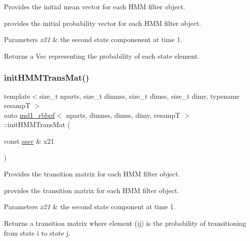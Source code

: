 Provides the initial mean vector for each H\+MM filter object. 

provides the initial probability vector for each H\+MM filter object. 
\begin{DoxyParams}{Parameters}
{\em x21} & the second state componenent at time 1. \\
\hline
\end{DoxyParams}
\begin{DoxyReturn}{Returns}
a Vec representing the probability of each state element. 
\end{DoxyReturn}
\mbox{\label{classmsl1__rbbpf_a811836dd2d71e3c46e688b9280aae108}} 
\subsubsection{\texorpdfstring{init\+H\+M\+M\+Trans\+Mat()}{initHMMTransMat()}}
{\footnotesize\ttfamily template$<$size\+\_\+t nparts, size\+\_\+t dimnss, size\+\_\+t dimss, size\+\_\+t dimy, typename resampT $>$ \\
auto \hyperlink{classmsl1__rbbpf}{msl1\+\_\+rbbpf}$<$ nparts, dimnss, dimss, dimy, resampT $>$\+::init\+H\+M\+M\+Trans\+Mat (\begin{DoxyParamCaption}\item[{const \hyperlink{classmsl1__rbbpf_a6703c548bb85bbe8e5a6baa723e8f0bb}{sssv} \&}]{x21 }\end{DoxyParamCaption})}



Provides the transition matrix for each H\+MM filter object. 

provides the transition matrix for each H\+MM filter object. 
\begin{DoxyParams}{Parameters}
{\em x21} & the second state component at time 1. \\
\hline
\end{DoxyParams}
\begin{DoxyReturn}{Returns}
a transition matrix where element (ij) is the probability of transitioning from state i to state j. 
\end{DoxyReturn}
\mbox{\label{classmsl1__rbbpf_acb7bb10daafe487b94f2158e4753c360}} 
